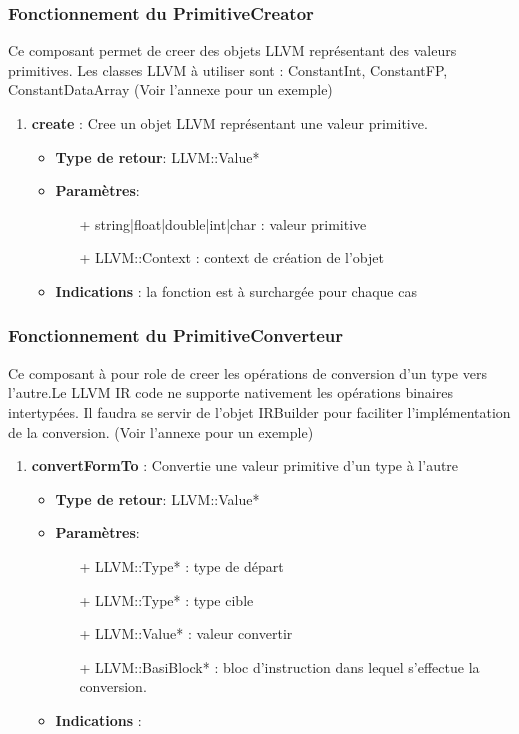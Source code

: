 \documentclass{article}
\begin{document}
   \subsubsection{Fonctionnement du PrimitiveCreator}
   Ce composant permet de creer des objets LLVM représentant des valeurs primitives.
   Les classes LLVM à utiliser sont : ConstantInt, ConstantFP, ConstantDataArray
   \small{(Voir l'annexe pour un exemple)}

   \begin{enumerate} 
    \item \textbf{create} : Cree un objet LLVM représentant une valeur primitive.
   \begin{itemize}
     \item \textbf{Type de retour}: LLVM::Value*
     \item \textbf{Paramètres}:
     \begin{enumerate}
       \item[+] string|float|double|int|char : valeur primitive
       \item[+] LLVM::Context : context de création de l'objet
     \end{enumerate}
     \item \textbf{Indications} : la fonction est à surchargée pour chaque cas
   \end{itemize}

   \end{enumerate}


   \subsubsection{Fonctionnement du PrimitiveConverteur}
   Ce composant à pour role de creer les opérations de conversion d'un type vers l'autre.Le LLVM IR code ne supporte nativement les opérations binaires intertypées. Il faudra se servir de l'objet IRBuilder pour faciliter l'implémentation de la conversion. \small{(Voir l'annexe pour un exemple)}

   \begin{enumerate} 
    \item \textbf{convertFormTo} : Convertie une valeur primitive d'un type à l'autre
   \begin{itemize}
     \item \textbf{Type de retour}: LLVM::Value*
     \item \textbf{Paramètres}:
     \begin{enumerate}
       \item[+] LLVM::Type*  : type de départ
       \item[+] LLVM::Type*  : type cible
       \item[+] LLVM::Value* : valeur  convertir
       \item[+] LLVM::BasiBlock* : bloc d'instruction dans lequel s'effectue la conversion.  
     \end{enumerate}
     \item \textbf{Indications} : 
     \end{itemize}
   \end{enumerate}
\end{document}
